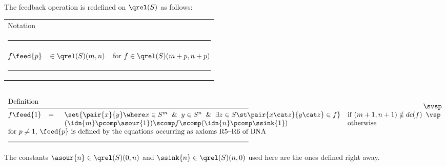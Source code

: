 \documentclass[fleqn]{llncs}
\begin{document}
The feedback operation is redefined on $\qrel(S)$ as follows:
\begin{center}
\footnotesize
\begin{tabular}{lll}
\multicolumn{3}{l}{Notation} \\[-1.25ex]
\multicolumn{3}{l}{\rule{.99\textwidth}{.125mm}} \svsp \\
$f \feed{p}$ & $\in \qrel(S)(m,n)$ & for $f \in \qrel(S)(m+p,n+p)$ \\
\multicolumn{3}{l}{\rule{.99\textwidth}{.125mm}}
\end{tabular}
\svsp \\
$
\begin{array}{lll}
\multicolumn{3}{l}{\mbox{Definition}} \\[-1.25ex]
\multicolumn{3}{l}{\rule{.99\textwidth}{.125mm}} \svsp \\
f \feed{1} & = &
\begin{array}[t]{ll}
\set{\pair{x}{y} \where
     x \in S^m \And y \in S^n \And
     \exists z \in S \st \pair{x \cat z}{y \cat z} \in f}
& \mbox{if } (m+1,n+1) \notin dc(f) \\
(\idn{m} \pcomp \asour{1}) \scomp f \scomp (\idn{n} \pcomp \ssink{1})
& \mbox{otherwise}
\end{array}
\vsp \\
\multicolumn{3}{l}{
\mbox{for $p \neq 1$, $\feed{p}$ is defined by the equations occurring
as axioms R5--R6 of BNA}} \\
\multicolumn{3}{l}{\rule{.99\textwidth}{.125mm}}
\end{array}
$
\end{center}
The constants $\asour{n} \in \qrel(S)(0,n)$ and
$\ssink{n} \in \qrel(S)(n,0)$ used here are the ones defined right
away.
\end{document}

